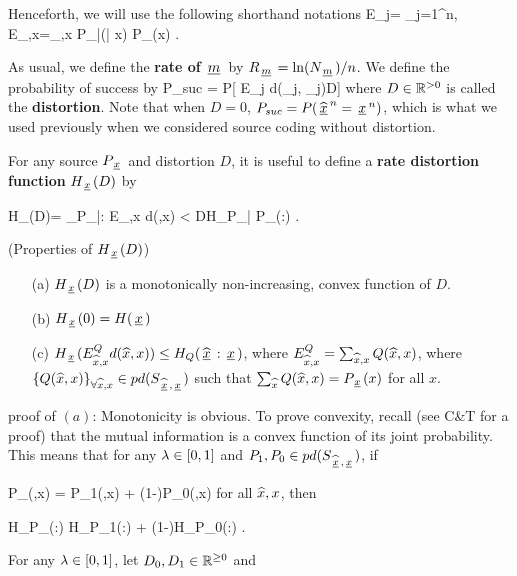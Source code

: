 \documentclass[12pt]{article}
\begin{document}
Henceforth, we will use
the following shorthand notations
\beq
E_j= \sum_{j=1}^n\;,
\;\;
E_{,x}=\sum_{,x} P_{\what{\rvx}|\rvx}(| x)
P_\rvx(x)
\;.
\eeq

As usual, we define the  {\bf rate of} ${\,\underline{m}\,}$
by $R_{\,\underline{m}\,} = \ln(N_{\,\underline{m}\,})/n$.
We define the probability of success by
\beq
P_{suc} = P[
E_j d(\what{\rvx}_j, \rvx_j)\leq D]
\;
\label{eq-def-of-d}
\eeq
where $D\in{ \mathbb{R}}^{>0}$ is called
the {\bf distortion}.
Note that when $D=0$,
$P_{suc}= P({\widehat{{\,\underline{x}\,}}}^n={\,\underline{x}\,}^n)$,
which is what we used
previously when we considered
source coding
without distortion.

For any source $P_{\,\underline{x}\,}$ and distortion $D$,
it is useful to define a
{\bf rate distortion function}
$H_{\,\underline{x}\,}(D)$ by

\beq
H_\rvx(D)=
\min_{P_{\what{\rvx}|\rvx}:
E_{,x} d(,x)
< D}H_{P_{\what{\rvx}|\rvx}
P_\rvx}(\what{\rvx}:\rvx)
\;.
\eeq

\begin{claim}\label{cl-props-rat-dis}
(Properties of $H_{\,\underline{x}\,}(D)$)

\begin{itemize}
\item[(a)]
$H_{\,\underline{x}\,}(D)$ is a monotonically non-increasing,
convex
function of $D$.
\item[(b)]
$H_{\,\underline{x}\,}(0) = H({\,\underline{x}\,})$
\item[(c)]
$H_{\,\underline{x}\,}(E^{Q}_{{\widehat{x}},x}d({\widehat{x}},x))
\leq H_{Q}({\widehat{{\,\underline{x}\,}}}:{\,\underline{x}\,})$,
where $E^{Q}_{{\widehat{x}},x}=\sum_{{\widehat{x}},x}
Q({\widehat{x}},x)$,
where $\{Q({\widehat{x}},x)\}_{\forall {\widehat{x}},x}
\in pd(S_{{\widehat{{\,\underline{x}\,}}},{\,\underline{x}\,}})$
such that
$\sum_{{\widehat{x}}}Q({\widehat{x}},x)=P_{\,\underline{x}\,}(x)$
for all $x$.

\end{itemize}
\end{claim}
\proof

proof of $(a)$: Monotonicity is obvious.
To prove convexity, recall
(see C\&T for a proof) that
the mutual information is a convex
function of its joint probability.
This means that
for any ${ \lambda }\in [0,1]$
and
$P_1, P_0\in pd(S_{{\widehat{{\,\underline{x}\,}}},{\,\underline{x}\,}})$,
if

\beq
P_\lam(,x) =
\lam P_1(,x) +
(1-\lam)P_0(,x)
\;
\label{eq-p-lam-def}
\eeq
for all ${\widehat{x}},x$,
then

\beq
H_{P_\lam}(\what{\rvx}:\rvx) \leq
\lam H_{P_1}(\what{\rvx}:\rvx) +
(1-\lam)H_{P_0}(\what{\rvx}:\rvx)
\;.
\eeq

For any
${ \lambda } \in [0,1]$,
let
$D_0, D_1\in { \mathbb{R}}^{\geq 0}$
and
\end{document}
